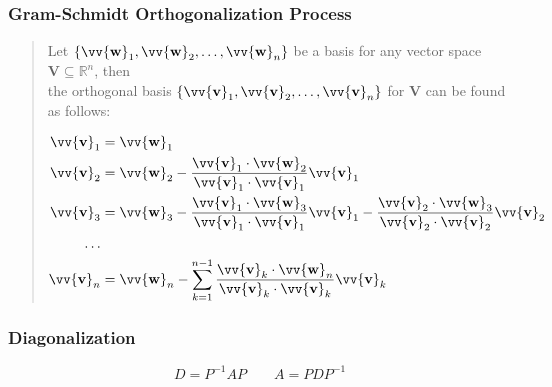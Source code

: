 \documentclass[11pt]{article}
\DeclareRobustCommand{\myvec}[1]{\vv{\mathbf{#1}}}
\newcommand{\mysubvecsp}[1]{\bm{{#1}}}
\newcommand{\mymat}[1]{#1}
\newcommand{\dotprod}[2]{#1 \cdot #2}
\begin{document}
    \subsubsection*{Gram-Schmidt Orthogonalization Process}
    \begin{quote}
        Let $\{\myvec{w}_1, \myvec{w}_2, \dots, \myvec{w}_n\}$ be a basis for any vector space $\mysubvecsp{V} \subseteq \mathbb{R}^n$, then\\
        the orthogonal basis $\{\myvec{v}_1, \myvec{v}_2, \dots, \myvec{v}_n\}$ for $\mysubvecsp{V}$ can be found as follows:
    
        \begin{align*}
            \myvec{v}_1 &= \myvec{w}_1 \\
            \myvec{v}_2 &= \myvec{w}_2 - \frac{\dotprod{\myvec{v}_1}{\myvec{w}_2}}{\dotprod{\myvec{v}_1}{\myvec{v}_1}}\myvec{v}_1 \\
            \myvec{v}_3 &= \myvec{w}_3 - \frac{\dotprod{\myvec{v}_1}{\myvec{w}_3}}{\dotprod{\myvec{v}_1}{\myvec{v}_1}}\myvec{v}_1 - \frac{\dotprod{\myvec{v}_2}{\myvec{w}_3}}{\dotprod{\myvec{v}_2}{\myvec{v}_2}}\myvec{v}_2 \\
            \dots \\
            \myvec{v}_n &= \myvec{w}_n - \sum_{k = 1}^{n-1} \frac{\dotprod{\myvec{v}_k}{\myvec{w}_n}}{\dotprod{\myvec{v}_k}{\myvec{v}_k}}\myvec{v}_k \\
        \end{align*}
    \end{quote}
    \subsubsection*{Diagonalization}
    \[ \mymat{D} = \mymat{P}^{-1}\mymat{A}\mymat{P} \qquad \mymat{A} = \mymat{P}\mymat{D}\mymat{P}^{-1} \]
    
\end{document}
